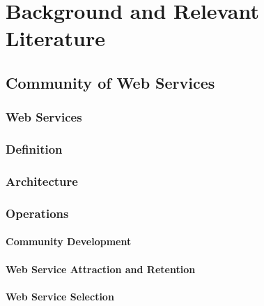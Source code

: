 \setcounter{chapter}{1}

\chapter{Background and Relevant Literature}\label{sec:MAS}



    \section{Community of Web Services}\label{sec:CommunityWS}


        \subsection{Web Services}\label{sec:BRWS}


        \subsection{Definition}\label{sec:CWSDefinition}

        \subsection{Architecture}\label{sec:CWSArchitecture}

        \subsection{Operations}\label{sec:CWSOperations}

            \subsubsection{Community Development}\label{sec:CWSCommunityDev}

            \subsubsection{Web Service Attraction and Retention}\label{sec:CWSAttraction}

            \subsubsection{Web Service Selection}\label{sec:CWSSelection}



